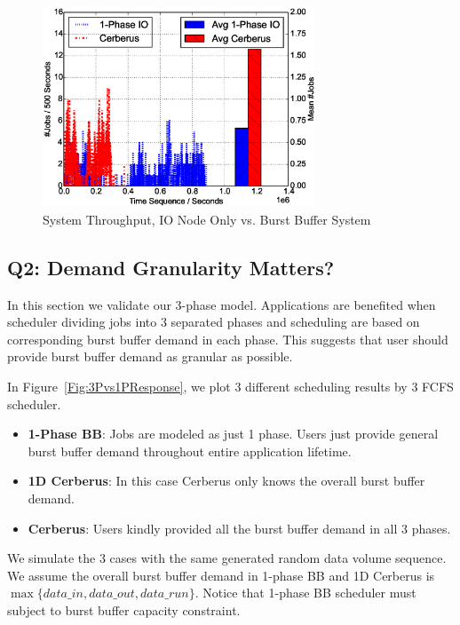 \begin{figure}[!t]
        \centering
        \includegraphics[width=3.2in]{IOvsBBFigures/1000jobs_direct_vs_bb_throughput}
        \caption{System Throughput, IO Node Only vs. Burst Buffer System}
        \label{Fig:DirectIOvsBBThroughput}
\end{figure}


\subsection{Q2: Demand Granularity Matters?}
In this section we validate our 3-phase model.
Applications are benefited when scheduler dividing jobs into 3 separated phases and 
scheduling are based on corresponding burst buffer demand in each phase.
This suggests that user should provide burst buffer demand as granular as possible.

In Figure~\ref{Fig:3Pvs1PResponse}, we plot 3 different scheduling results by 3 FCFS scheduler.
\begin{itemize}
        \item \textbf{1-Phase BB}: Jobs are modeled as just 1 phase.
                Users just provide general burst buffer demand throughout
                entire application lifetime.
        \item \textbf{1D Cerberus}: In this case Cerberus only knows
                the overall burst buffer demand.
        \item \textbf{Cerberus}: Users kindly provided all the burst buffer
                demand in all 3 phases.
\end{itemize}
We simulate the 3 cases with the same generated random data volume sequence.
We assume the overall burst buffer demand in 1-phase BB and 1D Cerberus is
$\max \{data\_in, data\_out, data\_run\}$.
Notice that 1-phase BB scheduler must subject to burst buffer capacity constraint.

